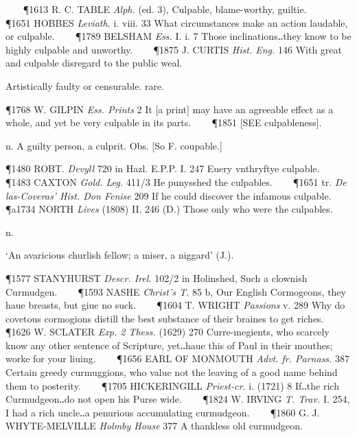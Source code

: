 \begin{description}[wide, labelwidth=!, labelindent=0pt]
\begin{myenumerate}
\P 1613 R. C. TABLE  \textit{Alph.} (ed. 3), Culpable, blame-worthy, guiltie.    
\P 1651 HOBBES  \textit{Leviath.} i. viii. 33 What circumstances make an action laudable, or culpable.    
\P 1789 BELSHAM  \textit{Ess.} I. i. 7 Those inclinations‥they know to be highly culpable and unworthy.    
\P 1875 J. CURTIS  \textit{Hist. Eng.} 146 With great and culpable disregard to the public weal.

 Artistically faulty or censurable. rare.

\P 1768 W. GILPIN  \textit{Ess. Prints} 2 It [a print] may have an agreeable effect as a whole, and yet be very culpable in its parts.    
\P 1851 [SEE culpableness].

 n. A guilty person, a culprit. Obs. [So F. coupable.]

\P 1480 ROBT.  \textit{Devyll} 720 in Hazl. E.P.P. I. 247 Euery vnthryftye culpable.    
\P 1483 CAXTON  \textit{Gold. Leg.} 411/3 He punysshed the culpables.    
\P 1651 tr.  \textit{De las-Coveras' Hist. Don Fenise} 209 If he could discover the infamous culpable.
\P a1734 NORTH  \textit{Lives} (1808) II. 246 (D.) Those only who were the culpables.
\end{myenumerate}


 n.

\noindent {}


\noindent
‘An avaricious churlish fellow; a miser, a niggard’ (J.).

\P 1577 STANYHURST  \textit{Descr. Irel.} 102/2 in Holinshed, Such a clownish Curmudgen.    
\P 1593 NASHE  \textit{Christ's T.} 85 b, Our English Cormogeons, they haue breasts, but giue no suck.    
\P 1604 T. WRIGHT  \textit{Passions} v. 289 Why do covetous cormogions distill the best substance of their braines to get riches.    
\P 1626 W. SCLATER  \textit{Exp. 2 Thess.} (1629) 270 Curre-megients, who scarcely know any other sentence of Scripture, yet‥haue this of Paul in their mouthes; worke for your liuing.    
\P 1656 EARL OF MONMOUTH  \textit{Advt. fr. Parnass.} 387 Certain greedy curmuggions, who value not the leaving of a good name behind them to posterity.    
\P 1705 HICKERINGILL  \textit{Priest-cr.} i. (1721) 8 If‥the rich Curmudgeon‥do not open his Purse wide.    
\P 1824 W. IRVING  \textit{T. Trav.} I. 254, I had a rich uncle‥a penurious accumulating curmudgeon.    
\P 1860 G. J. WHYTE-MELVILLE  \textit{Holmby House} 377 A thankless old curmudgeon.


\end{description}
